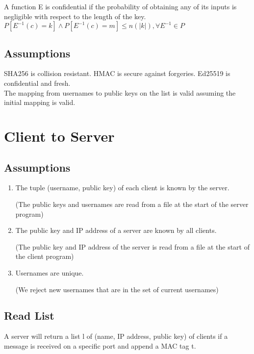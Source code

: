 \documentclass{article}
\begin{document}
A function E is confidential if the probability of obtaining any of its inputs is negligible with respect to the length of the key. \\

$P[E^{-1}(c) = k] \land P[E^{-1}(c) = m] \le n(|k|), \forall E^{-1} \in P$

\subsection{Assumptions}
SHA256 is collision resistant. HMAC is secure against forgeries. Ed25519 is confidential and fresh. \\

The mapping from usernames to public keys on the list is valid assuming the initial mapping is valid.

\section{Client to Server}

\subsection{Assumptions}
\begin{enumerate}
\item
The tuple (username, public key) of each client is known by the server.

(The public keys and usernames are read from a file at the start of the server program) \\

\item
The public key and IP address of a server are known by all clients.

(The public key and IP address of the server is read from a file at the start of the client program) \\

\item
Usernames are unique.

(We reject new usernames that are in the set of current usernames)
\end{enumerate}

\subsection{Read List}
A server will return a list l of (name, IP address, public key) of clients if a message is received on a specific port and append a MAC tag t.
\end{document}
